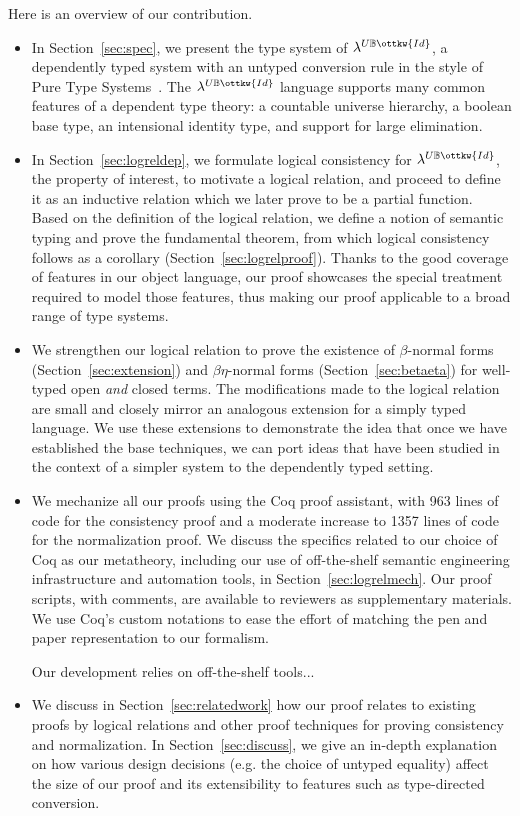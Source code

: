 \documentclass[acmsmall,screen=true,
\ifpublic review=false\else,review=true\fi
  ,anonymous=\ifanonymous true\else false\fi]{acmart}
\newcommand{\lang}{$\lambda^{U\mathbb{B}\ottkw{Id}}$\xspace}
\newcommand{\yl}[1]{}
\begin{document}
\yl{new overview starts here}
Here is an overview of our contribution.
\begin{itemize}
\item In Section~\ref{sec:spec},
we present the type system of \lang{},
a dependently typed system with an untyped conversion rule in the
style of Pure Type Systems~\citep{barendregt1991introduction}. The
\lang{} language supports many common features of a dependent
type theory: a countable universe hierarchy, a boolean base
type, an intensional identity type, and support for large elimination.
\item In Section~\ref{sec:logreldep}, we formulate logical consistency for \lang{}, the property of
interest, to motivate a logical relation, and proceed to define it as
an inductive relation which we later prove to be a partial
function. Based on the definition of the logical relation, we define
a notion of semantic typing and prove the fundamental theorem, from
which logical consistency follows as a corollary
(Section~\ref{sec:logrelproof}). Thanks to the good coverage of
features in our object language, our proof showcases the
special treatment required to model those features, thus making
our proof applicable to a broad range of type systems.
\item We strengthen our logical relation to prove the existence of
  $\beta$-normal forms (Section~\ref{sec:extension}) and
  $\beta\eta$-normal forms (Section~\ref{sec:betaeta}) for well-typed
  open \emph{and} closed terms. The modifications made to the logical
  relation are small and closely mirror an analogous extension for a
  simply typed language. We use these extensions to demonstrate the idea
  that once we have established the base techniques, we can port ideas
  that have been studied in the context of a simpler system to the
  dependently typed setting.
\item We mechanize all our proofs using the Coq proof assistant, with
  963 lines of code for the consistency proof and a moderate increase
  to 1357 lines of code for the normalization proof.
  We discuss the specifics
  related to our choice of Coq as our metatheory, including our use of
  off-the-shelf semantic engineering infrastructure and automation
  tools, in Section~\ref{sec:logrelmech}.
  Our proof scripts, with comments, are available to reviewers as
  supplementary materials. We use Coq's custom notations to ease the
  effort of matching the pen and paper representation to our formalism.
 \yl{I want to say something
  about the benefits of using existing libraries such as Autosubst 2
  and CoqHammer rather than rolling your own undocumented libraries that nobody
  want to (or can) reuse.}
Our development relies on off-the-shelf tools...
\item We discuss in Section~\ref{sec:relatedwork} how our proof
relates to existing proofs by logical relations and other proof
techniques for proving consistency and normalization. In
Section~\ref{sec:discuss}, we give an in-depth explanation on how
various design decisions (e.g. the choice of untyped equality) affect
the size of our proof and its extensibility to features such as
type-directed conversion.
\end{itemize}
\end{document}
